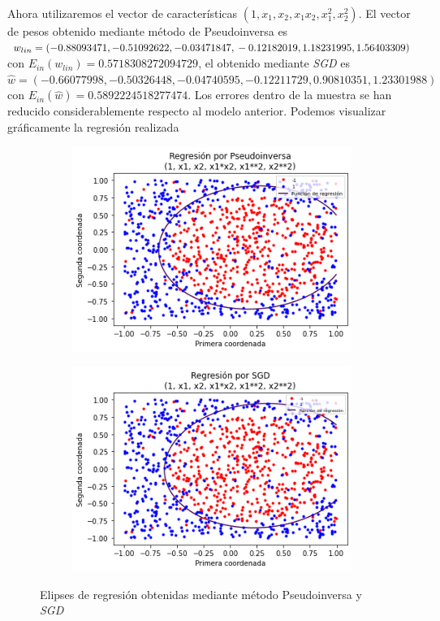 \documentclass[11pt,a4paper]{article}
\theoremstyle{definition}
\begin{document}
	Ahora utilizaremos el vector de características $(1,x_1,x_2,x_1x_2,x_1^2,x_2^2)$. El vector de pesos obtenido mediante método de Pseudoinversa es $w_{lin}=(-0.88093471, -0.51092622,  -0.03471847,\\ -0.12182019,  1.18231995,  1.56403309)$ con $E_{in}(w_{lin})=0.5718308272094729$, el obtenido mediante \textit{SGD} es $\hat w=(-0.66077998, -0.50326448, -0.04740595, -0.12211729,  0.90810351,  1.23301988)$ con $E_{in}(\hat w)=0.5892224518277474$. Los errores dentro de la muestra se han reducido considerablemente respecto al modelo anterior. Podemos visualizar gráficamente la regresión realizada
	\begin{figure}[H]
		\centering
		\begin{subfigure}{.488\textwidth}
  		\centering
  		\includegraphics[width=1\textwidth]{images/elip_pseudo}
  		\label{fig:sub1}
		\end{subfigure}%
		\begin{subfigure}{.512\textwidth}
  		\centering
  		\includegraphics[width=1\textwidth]{images/elip_sgd}
  		\label{fig:sub2}
		\end{subfigure}
		\caption{Elipses de regresión obtenidas mediante método Pseudoinversa y \textit{SGD}}
		\label{fig:test}
	\end{figure}
	
\end{document}

